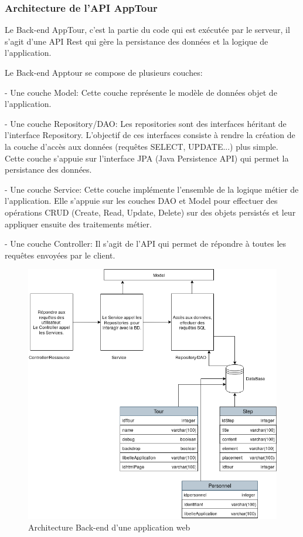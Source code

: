 \documentclass[12pt]{article}
\begin{document}
\subsubsection{Architecture de l'API AppTour}

Le Back-end AppTour, c’est la partie du code qui est exécutée par le serveur, il s'agit d'une API Rest qui gère la persistance des données et la logique de l'application. 
 

Le Back-end Apptour se compose de plusieurs couches: \newline

- Une couche Model: Cette couche représente le modèle de données objet de l'application. \newline

- Une couche Repository/DAO: Les repositories sont des interfaces héritant de l'interface Repository. L'objectif de ces interfaces consiste à rendre la création de la couche d'accès aux données (requêtes SELECT, UPDATE...) plus simple. Cette couche s'appuie sur l'interface JPA (Java Persistence API) qui permet la persistance des données.\newline


- Une couche Service: Cette couche implémente l'ensemble de la logique métier de l'application. Elle s'appuie sur les couches DAO et Model pour effectuer des opérations CRUD (Create, Read, Update, Delete) sur des objets persistés et leur appliquer ensuite des traitements métier.\newline


- Une couche Controller: Il s'agit de l'API qui permet de répondre à toutes les requêtes envoyées par le client. 



\begin{figure}[H]
	\centering
 		\includegraphics[width=1\textwidth]{diagrammes/Architecture_Apptour.png}
  		\caption{Architecture Back-end d'une application web}
	\end{figure}
	
\end{document}

